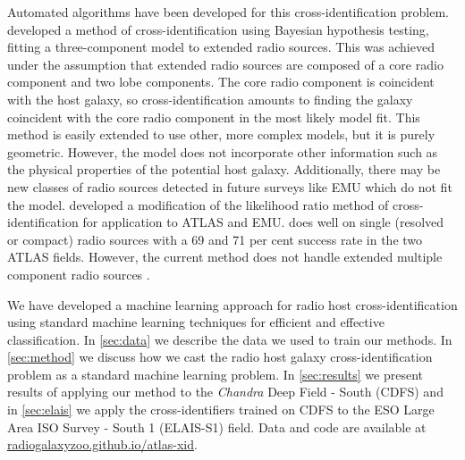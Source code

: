 \documentclass[fleqn,usenatbib,usedcolumn]{mnras}
\begin{document}
  Automated algorithms have been developed for this cross-identification
  problem. \citet{fan15} developed a method of cross-identification using
  Bayesian hypothesis testing, fitting a three-component model to extended radio
  sources. This was achieved under the assumption that extended radio sources are composed of a core radio
  component and two lobe components. The core radio component is coincident with
  the host galaxy, so cross-identification amounts to finding the galaxy
  coincident with the core radio component in the most likely model fit. This method is easily
  extended to use other, more complex models, but it is purely geometric.  However, the model
  does not incorporate other information such as the physical properties of the potential
  host galaxy. Additionally, there may be new classes of radio sources detected
  in future surveys like EMU which do not fit the model. \citet{weston17}
  developed a modification of the likelihood ratio method of
  cross-identification \citep{richter75likelihood} for application to ATLAS and EMU. \citet{weston17} does well on single (resolved or compact) radio sources with a 69 and 71 per cent success rate in the two ATLAS fields.
  However, the current method does not handle extended multiple component radio sources \citep{norris17unexpected}.

  We have developed a
  machine learning approach for radio host cross-identification using standard
  machine learning techniques for efficient and effective classification. In \autoref{sec:data} we describe the data we
  used to train our methods. In \autoref{sec:method} we discuss how we cast the
  radio host galaxy cross-identification problem as a standard machine learning
  problem. In \autoref{sec:results} we present results of applying our method to
  the \emph{Chandra} Deep Field - South (CDFS) and in \autoref{sec:elais} we
  apply the cross-identifiers trained on CDFS to the ESO Large Area ISO Survey -
  South 1 (ELAIS-S1) field. Data and code are available at \url{radiogalaxyzoo.github.io/atlas-xid}.
\end{document}
